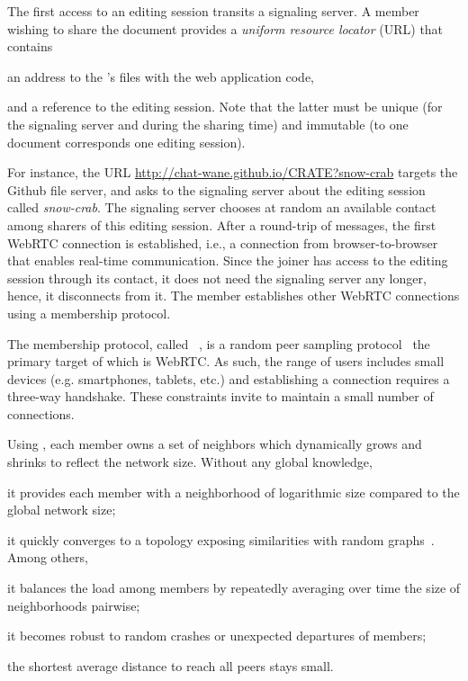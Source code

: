 \begin{asparadesc}
\item [The first access] to an editing session transits a signaling server. A
  member wishing to share the document provides a \emph{uniform resource
    locator} (URL) that contains
  \begin{inparaenum}[(i)]
  \item an address to the \CRATE's files with the web application
    code,
  \item and a reference to the editing session. Note that the latter must be
    unique (for the signaling server and during the sharing time) and
    immutable (to one document corresponds one editing session).
  \end{inparaenum}
  For instance, the URL \url{http://chat-wane.github.io/CRATE?snow-crab} targets
  the Github file server, and asks to the signaling server about the editing
  session called \emph{snow-crab}.  The signaling server chooses at random an
  available contact among sharers of this editing session. After a round-trip of
  messages, the first WebRTC connection is established, i.e., a connection from
  browser-to-browser that enables real-time communication. Since the joiner has
  access to the editing session through its contact, it does not need the
  signaling server any longer, hence, it disconnects from it. The member
  establishes other WebRTC connections using a membership protocol.

\item [The membership protocol,] called \SPRAY~\cite{nedelec2015spray}, is a
  random peer sampling protocol~\cite{jelasity2007gossip} the primary target of
  which is WebRTC.  As such, the range of users includes small devices
  (e.g. smartphones, tablets, etc.) and establishing a connection requires a
  three-way handshake. These constraints invite to maintain a small number of
  connections.

  Using \SPRAY, each member owns a set of neighbors which dynamically grows and
  shrinks to reflect the network size. Without any global knowledge,
  \begin{inparaenum}[(i)]
  \item it provides each member with a neighborhood of logarithmic size compared
    to the global network size;
  \item it quickly converges to a topology exposing similarities with random
    graphs~\cite{erdos1959random}. Among others,
    \begin{inparaenum}[(a)]
    \item it balances the load among members by repeatedly averaging over time the
      size of neighborhoods pairwise;
    \item it becomes robust to random crashes or unexpected departures of
      members;
    \item the shortest average distance to reach all peers stays small.
    \end{inparaenum}
  \end{inparaenum}
  

\end{asparadesc}

